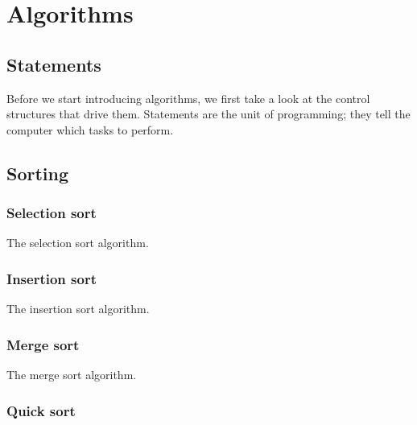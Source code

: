 \chapter{Algorithms}\label{chapter:algorithms}

\section{Statements}

Before we start introducing algorithms, we first take a look at the control structures that drive them. Statements are the unit of programming; they tell the computer which tasks to perform.

\section{Sorting}

\subsection{Selection sort}


\begin{algorithm}[H]
	{
		
	}
	\caption{The selection sort algorithm.}
	\label{alg:selection-sort}
\end{algorithm}




\subsection{Insertion sort}

\begin{algorithm}[H]
	{
		
	}
	\caption{The insertion sort algorithm.}
	\label{alg:insertion-sort}
\end{algorithm}






\subsection{Merge sort}


\begin{algorithm}[H]
	{
		
	}
	\caption{The merge sort algorithm.}
	\label{alg:merge-sort}
\end{algorithm}


\subsection{Quick sort}

